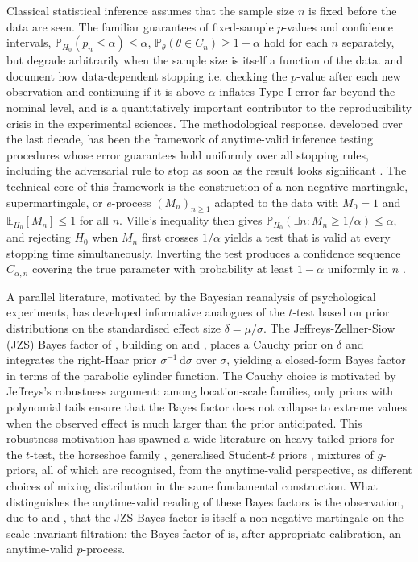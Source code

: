 \documentclass[12pt, a4paper]{report}
\newcommand{\E}{\mathbb{E}}
\newcommand{\dd}{\,\mathrm{d}}
\newcommand{\1}{\mathbf{1}}
\begin{document}
Classical statistical inference assumes that the sample size \(n\) is
fixed before the data are seen. The familiar guarantees of fixed-sample
\(p\)-values and confidence intervals, \(\mathbb{P}_{H_0}(p_n \leq \alpha) \leq \alpha\), \(\mathbb{P}_\theta(\theta \in C_n) \geq 1-\alpha\) hold for each \(n\) separately, but degrade arbitrarily when the sample size is itself a function of the data. 
\cite{wagenmakers2007practical} and \cite{simmons2011false} document how
data-dependent stopping i.e. checking the \(p\)-value after each new
observation and continuing if it is above \(\alpha\) inflates Type I
error far beyond the nominal level, and is a quantitatively important
contributor to the reproducibility crisis in the experimental sciences.
The methodological response, developed over the last decade, has been the framework of anytime-valid inference testing procedures whose error
guarantees hold uniformly over all stopping rules, including the
adversarial rule to stop as soon as the result looks significant
\citep{Howard2021, grunwald2020safe, RamdasGrunwald2023}. The technical core of this framework is the construction of a non-negative martingale, supermartingale, or \(e\)-process \((M_n)_{n\geq 1}\) adapted to the data with \(M_0=1\) and \(\E_{H_0}[M_n]\leq 1\) for all \(n\). Ville's inequality \citep{ville1939etude} then gives \(\mathbb{P}_{H_0}(\exists n: M_n \geq 1/\alpha) \leq \alpha\), and rejecting \(H_0\) when \(M_n\) first crosses \(1/\alpha\) yields a test that is valid at every stopping time simultaneously. Inverting the test produces a confidence
sequence \(C_{\alpha,n}\) covering the true parameter with probability
at least \(1-\alpha\) uniformly in \(n\) \citep{Darling1967, Robbins1970, Lai1976}.

A parallel literature, motivated by the Bayesian reanalysis of
psychological experiments, has developed informative analogues of the
\(t\)-test based on prior distributions on the standardised effect size
\(\delta=\mu/\sigma\). The Jeffreys-Zellner-Siow (JZS) Bayes factor of
\cite{Rouder2009}, building on \cite{jeffreys1998theory} and
\cite{zellner1980posterior}, places a Cauchy prior on \(\delta\) and
integrates the right-Haar prior \(\sigma^{-1}\dd\sigma\) over \(\sigma\),
yielding a closed-form Bayes factor in terms of the parabolic cylinder
function. The Cauchy choice is motivated by Jeffreys's robustness
argument: among location-scale families, only priors with polynomial
tails ensure that the Bayes factor does not collapse to extreme values
when the observed effect is much larger than the prior anticipated.
This robustness motivation has spawned a wide literature on
heavy-tailed priors for the \(t\)-test, the horseshoe family
\cite{Carvalho2010}, generalised Student-\(t\) priors \cite{gronau2020informed}, mixtures of \(g\)-priors, all of which are recognised, from the anytime-valid perspective, as different choices of mixing distribution in the same fundamental construction. What distinguishes the anytime-valid reading of these Bayes factors is the observation, due to \cite{PerezOrtiz2024} and \cite{Wang2025}, that the JZS Bayes factor is itself a non-negative martingale on the scale-invariant filtration: the Bayes factor of \cite{Rouder2009} is, after appropriate calibration, an anytime-valid \(p\)-process.
\end{document}
